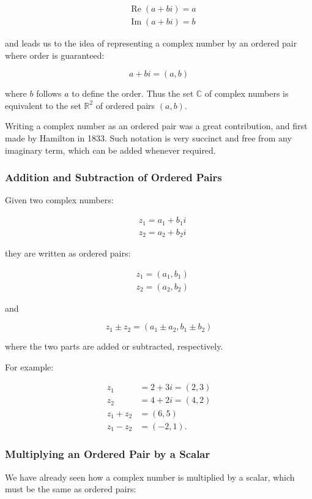 \documentclass[10pt]{article}
\begin{document}
$$
\begin{aligned}
& \operatorname{Re}(a+b i)=a \\
& \operatorname{Im}(a+b i)=b
\end{aligned}
$$

and leads us to the idea of representing a complex number by an ordered pair where order is guaranteed:

$$
a+b i=(a, b)
$$

where $b$ follows $a$ to define the order. Thus the set $\mathbb{C}$ of complex numbers is equivalent to the set $\mathbb{R}^{2}$ of ordered pairs $(a, b)$.

Writing a complex number as an ordered pair was a great contribution, and first made by Hamilton in 1833. Such notation is very succinct and free from any imaginary term, which can be added whenever required.

\subsubsection{Addition and Subtraction of Ordered Pairs}
Given two complex numbers:

$$
\begin{aligned}
& z_{1}=a_{1}+b_{1} i \\
& z_{2}=a_{2}+b_{2} i
\end{aligned}
$$

they are written as ordered pairs:

$$
\begin{aligned}
& z_{1}=\left(a_{1}, b_{1}\right) \\
& z_{2}=\left(a_{2}, b_{2}\right)
\end{aligned}
$$

and

$$
z_{1} \pm z_{2}=\left(a_{1} \pm a_{2}, b_{1} \pm b_{2}\right)
$$

where the two parts are added or subtracted, respectively.

For example:

$$
\begin{aligned}
z_{1} & =2+3 i=(2,3) \\
z_{2} & =4+2 i=(4,2) \\
z_{1}+z_{2} & =(6,5) \\
z_{1}-z_{2} & =(-2,1) .
\end{aligned}
$$

\subsubsection{Multiplying an Ordered Pair by a Scalar}
We have already seen how a complex number is multiplied by a scalar, which must be the same as ordered pairs:
\end{document}
